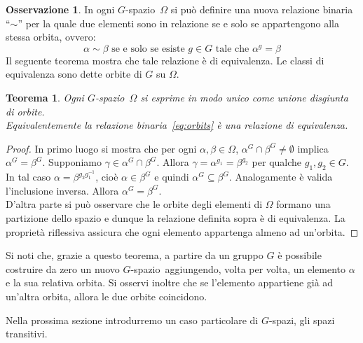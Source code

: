 \documentclass[12pt,a4paper,openright]{report}
\newcommand{\0}{\setminus\{0\}} %
\newcommand{\Gsp}{$G$-spazio~} %
\theoremstyle{definition}
\newtheorem{oss}[defn]{Osservazione}
\theoremstyle{plain}
\newtheorem{theo}[defn]{Teorema}
\begin{document}
\begin{oss} In ogni \Gsp $\Omega$ si può definire una nuova relazione binaria ``$\sim$'' per la quale due elementi sono in relazione se e solo se appartengono alla stessa orbita, ovvero:
\begin{equation}
\label{eq:orbits} \alpha \sim \beta \mbox{ se e solo se esiste } g \in G \mbox{ tale che } \alpha^g=\beta 
\end{equation}
Il seguente teorema mostra che tale relazione è di equivalenza. Le classi di equivalenza sono dette orbite di $G$ su $\Omega$.
\end{oss}

\begin{theo}
Ogni \Gsp $\Omega$ si esprime in modo unico come unione disgiunta di orbite. \\
Equivalentemente la relazione binaria~\eqref{eq:orbits} è una relazione di equivalenza.
\end{theo}
\begin{proof}
In primo luogo si mostra che per ogni $\alpha,\beta \in \Omega$, $\alpha^G \cap \beta^G \neq \emptyset$ implica $\alpha^G=\beta^G$. Supponiamo $\gamma \in \alpha^G \cap  \beta^G$. Allora $\gamma = \alpha^{g_1}=\beta^{g_2}$ per qualche $g_1,g_2 \in G$. In tal caso $\alpha=\beta^{g_2g_1^{-1}}$, cioè $\alpha \in \beta^G$ e quindi $\alpha^G \subseteq \beta^G$. Analogamente è valida l'inclusione inversa. Allora $\alpha^G=\beta^G$. \\
D'altra parte si può osservare che le orbite degli elementi di $\Omega$ formano una partizione dello spazio e dunque la relazione definita sopra è di equivalenza. La proprietà riflessiva assicura che ogni elemento appartenga almeno ad un'orbita.
\end{proof}

Si noti che, grazie a questo teorema, a partire da un gruppo $G$ è possibile costruire da zero un nuovo \Gsp aggiungendo, volta per volta, un elemento $\alpha$ e la sua relativa orbita. Si osservi inoltre che se l'elemento appartiene già ad un'altra orbita, allora le due orbite coincidono.

\medskip Nella prossima sezione introdurremo un caso particolare di $G$-spazi, gli spazi transitivi.
\end{document}
